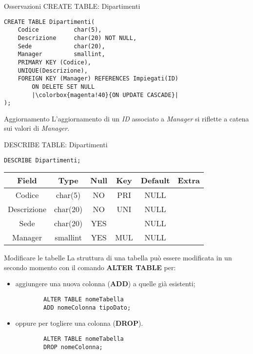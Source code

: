 %
\begin{frame}[fragile]{Osservazioni CREATE TABLE: Dipartimenti}
\vspace{-.6cm}
\begin{lstlisting}
CREATE TABLE Dipartimenti(
    Codice          char(5),
    Descrizione     char(20) NOT NULL,
    Sede            char(20),
    Manager         smallint,
    PRIMARY KEY (Codice),
    UNIQUE(Descrizione),
    FOREIGN KEY (Manager) REFERENCES Impiegati(ID)
        ON DELETE SET NULL
        |\colorbox{magenta!40}{ON UPDATE CASCADE}|
);    
\end{lstlisting}
\begin{block}{Aggiornamento}
    L'aggiornamento di un \textit{ID} associato a \textit{Manager} si riflette a catena sui valori di \textit{Manager}.
\end{block}
\end{frame}
%
\begin{frame}[fragile]{DESCRIBE TABLE: Dipartimenti}
\begin{lstlisting}
DESCRIBE Dipartimenti;
\end{lstlisting}
\begin{tabular}{|c|c|c|c|c|c|}
    \hline
    \rowcolor{cyan!30} Field & Type & Null & Key & Default & Extra \\
    \hline
    Codice & char(5) & NO & PRI & NULL & \\ \hline
    Descrizione & char(20) & NO & UNI & NULL & \\ \hline
    Sede & char(20) & YES & & NULL & \\ \hline
    Manager & smallint & YES & MUL & NULL & \\ \hline
\end{tabular}
\end{frame}
%
\begin{frame}[fragile]{Modificare le tabelle}
La struttura di una tabella pu\`o essere modificata in un secondo momento con il comando \textbf{ALTER TABLE} per:
\begin{itemize}
    \item aggiungere una nuova colonna (\textbf{ADD}) a quelle gi\`a esistenti;
    \begin{lstlisting}
        ALTER TABLE nomeTabella
        ADD nomeColonna tipoDato;
    \end{lstlisting}
    \item oppure per togliere una colonna (\textbf{DROP}).
    \begin{lstlisting}
        ALTER TABLE nomeTabella
        DROP nomeColonna;
    \end{lstlisting}
\end{itemize}
\end{frame}
